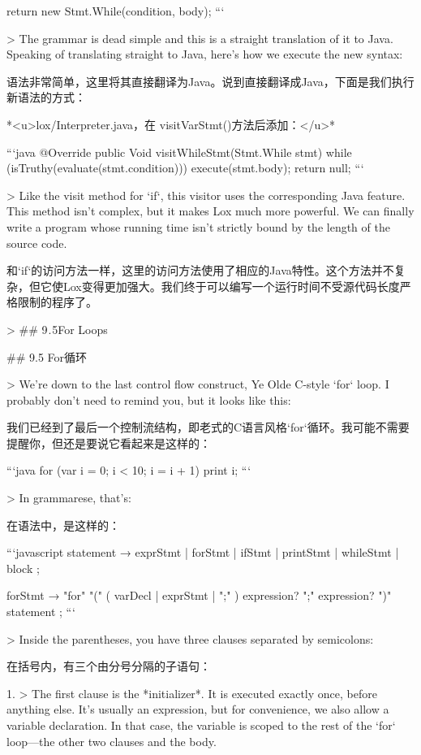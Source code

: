 \documentclass[cn,11pt,chinese]{elegantbook}
\begin{document}
{{{{{    return new Stmt.While(condition, body);
  }
```

> The grammar is dead simple and this is a straight translation of it to Java. Speaking of translating straight to Java, here’s how we execute the new syntax:

语法非常简单，这里将其直接翻译为Java。说到直接翻译成Java，下面是我们执行新语法的方式：

*<u>lox/Interpreter.java，在 visitVarStmt()方法后添加：</u>*

```java
  @Override
  public Void visitWhileStmt(Stmt.While stmt) {
    while (isTruthy(evaluate(stmt.condition))) {
      execute(stmt.body);
    }
    return null;
  }
```

> Like the visit method for `if`, this visitor uses the corresponding Java feature. This method isn’t complex, but it makes Lox much more powerful. We can finally write a program whose running time isn’t strictly bound by the length of the source code.

和`if`的访问方法一样，这里的访问方法使用了相应的Java特性。这个方法并不复杂，但它使Lox变得更加强大。我们终于可以编写一个运行时间不受源代码长度严格限制的程序了。

> ## 9 . 5For Loops

## 9.5 For循环

> We’re down to the last control flow construct, Ye Olde C-style `for` loop. I probably don’t need to remind you, but it looks like this:

我们已经到了最后一个控制流结构，即老式的C语言风格`for`循环。我可能不需要提醒你，但还是要说它看起来是这样的： 

```java
for (var i = 0; i < 10; i = i + 1) print i;
```

> In grammarese, that’s:

在语法中，是这样的：

```javascript
statement      → exprStmt
               | forStmt
               | ifStmt
               | printStmt
               | whileStmt
               | block ;

forStmt        → "for" "(" ( varDecl | exprStmt | ";" )
                 expression? ";"
                 expression? ")" statement ;
```

> Inside the parentheses, you have three clauses separated by semicolons:

在括号内，有三个由分号分隔的子语句：

1. > The first clause is the *initializer*. It is executed exactly once, before anything else. It’s usually an expression, but for convenience, we also allow a variable declaration. In that case, the variable is scoped to the rest of the `for` loop—the other two clauses and the body.

}}}}
\end{document}
